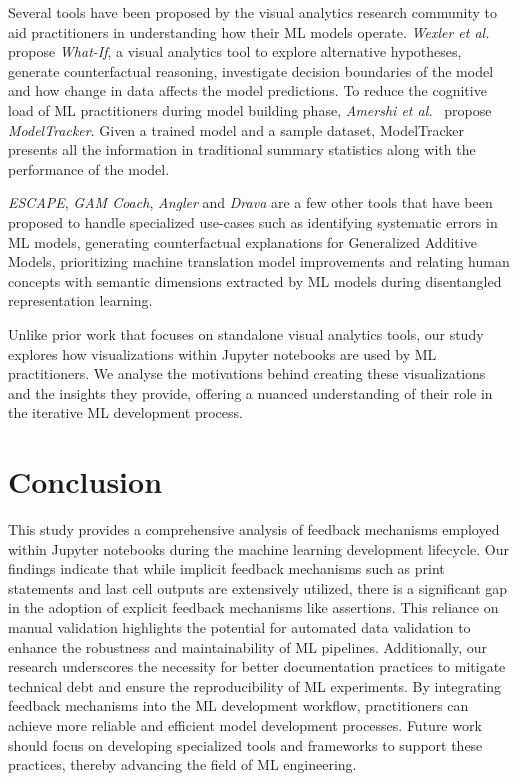 Several tools have been proposed by the visual analytics research community to aid practitioners in understanding how their ML models operate. \emph{Wexler et al.}~\cite{wexler2019what-if} propose \textit{What-If}, a visual analytics tool to explore alternative hypotheses, generate counterfactual reasoning, investigate decision boundaries of the model and how change in data affects the model predictions. To reduce the cognitive load of ML practitioners during model building phase, \emph{Amershi et al.}~\cite{amershi2019software} propose \textit{ModelTracker}. Given a trained model and a sample dataset, ModelTracker presents all the information in traditional summary statistics along with the performance of the model.

\textit{ESCAPE}, \textit{GAM Coach}, \textit{Angler} and \textit{Drava} are a few other tools that have been proposed to handle specialized use-cases such as identifying systematic errors in ML models, generating counterfactual explanations for Generalized Additive Models, prioritizing machine translation model improvements and relating human concepts with semantic dimensions extracted by ML models during disentangled representation learning\cite{ahn2023escape,wang2023gam,robertson2023angler,wang2023drava}.

Unlike prior work that focuses on standalone visual analytics tools, our study explores how visualizations within Jupyter notebooks are used by ML practitioners. We analyse the motivations behind creating these visualizations and the insights they provide, offering a nuanced understanding of their role in the iterative ML development process.

\section{Conclusion}

This study provides a comprehensive analysis of feedback mechanisms employed within Jupyter notebooks during the machine learning development lifecycle. Our findings indicate that while implicit feedback mechanisms such as print statements and last cell outputs are extensively utilized, there is a significant gap in the adoption of explicit feedback mechanisms like assertions. This reliance on manual validation highlights the potential for automated data validation to enhance the robustness and maintainability of ML pipelines. Additionally, our research underscores the necessity for better documentation practices to mitigate technical debt and ensure the reproducibility of ML experiments. By integrating feedback mechanisms into the ML development workflow, practitioners can achieve more reliable and efficient model development processes. Future work should focus on developing specialized tools and frameworks to support these practices, thereby advancing the field of ML engineering.



